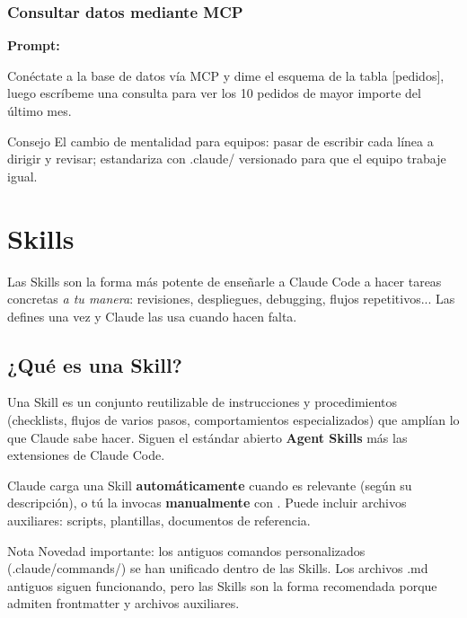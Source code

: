 \documentclass[11pt,a4paper]{report}
\DeclareRobustCommand{\texttt}[1]{{\ttfamily\seqsplit{#1}}}
\begin{document}
\subsection{Consultar datos mediante MCP}

\noindent\textbf{Prompt: }
\begin{codebox}
Conéctate a la base de datos vía MCP y dime el esquema de la tabla [pedidos], luego escríbeme una consulta para ver los 10 pedidos de mayor importe del último mes.
\end{codebox}

\begin{calloutbox}{Consejo}
El cambio de mentalidad para equipos: pasar de escribir cada línea a dirigir y revisar; estandariza con .claude/ versionado para que el equipo trabaje igual.\end{calloutbox}


\chapter{Skills}

Las Skills son la forma más potente de enseñarle a Claude Code a hacer tareas concretas \emph{a tu manera}: revisiones, despliegues, debugging, flujos repetitivos... Las defines una vez y Claude las usa cuando hacen falta.

\section{¿Qué es una Skill?}

Una Skill es un conjunto reutilizable de instrucciones y procedimientos (checklists, flujos de varios pasos, comportamientos especializados) que amplían lo que Claude sabe hacer. Siguen el estándar abierto \textbf{Agent Skills} más las extensiones de Claude Code.

Claude carga una Skill \textbf{automáticamente} cuando es relevante (según su descripción), o tú la invocas \textbf{manualmente} con \texttt{/nombre-skill}. Puede incluir archivos auxiliares: scripts, plantillas, documentos de referencia.

\begin{calloutbox}{Nota}
Novedad importante: los antiguos comandos personalizados (.claude/commands/) se han unificado dentro de las Skills. Los archivos .md antiguos siguen funcionando, pero las Skills son la forma recomendada porque admiten frontmatter y archivos auxiliares.\end{calloutbox}
\end{document}
